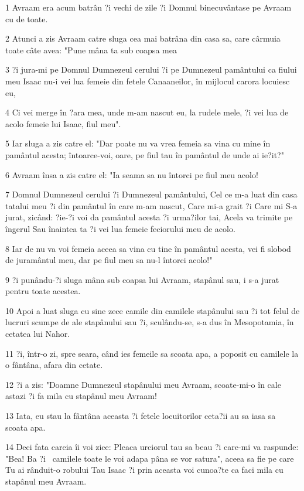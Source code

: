 \par 1 Avraam era acum batrân ?i vechi de zile ?i Domnul binecuvântase pe Avraam cu de toate.
\par 2 Atunci a zis Avraam catre sluga cea mai batrâna din casa sa, care cârmuia toate câte avea: "Pune mâna ta sub coapsa mea
\par 3 ?i jura-mi pe Domnul Dumnezeul cerului ?i pe Dumnezeul pamântului ca fiului meu Isaac nu-i vei lua femeie din fetele Canaaneilor, în mijlocul carora locuiesc eu,
\par 4 Ci vei merge în ?ara mea, unde m-am nascut eu, la rudele mele, ?i vei lua de acolo femeie lui Isaac, fiul meu".
\par 5 Iar sluga a zis catre el: "Dar poate nu va vrea femeia sa vina cu mine în pamântul acesta; întoarce-voi, oare, pe fiul tau în pamântul de unde ai ie?it?"
\par 6 Avraam însa a zis catre el: "Ia seama sa nu întorci pe fiul meu acolo!
\par 7 Domnul Dumnezeul cerului ?i Dumnezeul pamântului, Cel ce m-a luat din casa tatalui meu ?i din pamântul în care m-am nascut, Care mi-a grait ?i Care mi S-a jurat, zicând: ?ie-?i voi da pamântul acesta ?i urma?ilor tai, Acela va trimite pe îngerul Sau înaintea ta ?i vei lua femeie feciorului meu de acolo.
\par 8 Iar de nu va voi femeia aceea sa vina cu tine în pamântul acesta, vei fi slobod de juramântul meu, dar pe fiul meu sa nu-l întorci acolo!"
\par 9 ?i punându-?i sluga mâna sub coapsa lui Avraam, stapânul sau, i s-a jurat pentru toate acestea.
\par 10 Apoi a luat sluga cu sine zece camile din camilele stapânului sau ?i tot felul de lucruri scumpe de ale stapânului sau ?i, sculându-se, s-a dus în Mesopotamia, în cetatea lui Nahor.
\par 11 ?i, într-o zi, spre seara, când ies femeile sa scoata apa, a poposit cu camilele la o fântâna, afara din cetate.
\par 12 ?i a zis: "Doamne Dumnezeul stapânului meu Avraam, scoate-mi-o în cale astazi ?i fa mila cu stapânul meu Avraam!
\par 13 Iata, eu stau la fântâna aceasta ?i fetele locuitorilor ceta?ii au sa iasa sa scoata apa.
\par 14 Deci fata careia îi voi zice: Pleaca urciorul tau sa beau ?i care-mi va raspunde: "Bea! Ba ?i  camilele toate le voi adapa pâna se vor satura", aceea sa fie pe care Tu ai rânduit-o robului Tau Isaac ?i prin aceasta voi cunoa?te ca faci mila cu stapânul meu Avraam.
